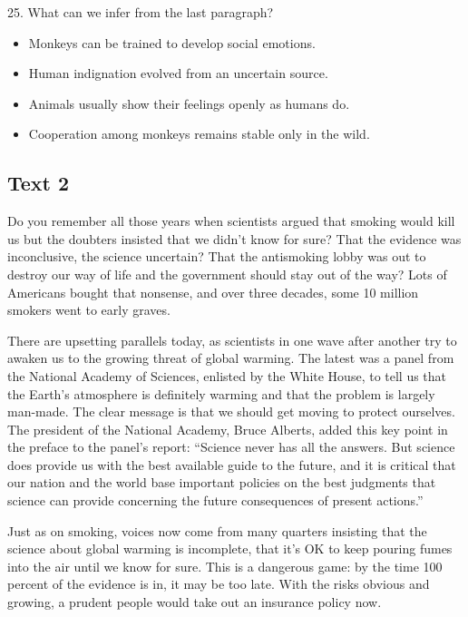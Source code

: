 \documentclass[UTF8,11pt]{ctexart}
\begin{document}
25. What can we infer from the last paragraph?


\begin{itemize}[leftmargin=2em,itemsep=.2em,topsep=.4em]\item[A.] Monkeys can be trained to develop social emotions.
\item[B.] Human indignation evolved from an uncertain source.
\item[C.] Animals usually show their feelings openly as humans do.
\item[D.] Cooperation among monkeys remains stable only in the wild.
\end{itemize}

\subsection*{\textbf{Text 2}}


Do you remember all those years when scientists argued that smoking would kill us but the doubters insisted that we didn’t know for sure? That the evidence was inconclusive, the science uncertain? That the antismoking lobby was out to destroy our way of life and the government should stay out of the way? Lots of Americans bought that nonsense, and over three decades, some 10 million smokers went to early graves.


There are upsetting parallels today, as scientists in one wave after another try to awaken us to the growing threat of global warming. The latest was a panel from the National Academy of Sciences, enlisted by the White House, to tell us that the Earth’s atmosphere is definitely warming and that the problem is largely man-made. The clear message is that we should get moving to protect ourselves. The president of the National Academy, Bruce Alberts, added this key point in the preface to the panel’s report: “Science never has all the answers. But science does provide us with the best available guide to the future, and it is critical that our nation and the world base important policies on the best judgments that science can provide concerning the future consequences of present actions.”


Just as on smoking, voices now come from many quarters insisting that the science about global warming is incomplete, that it’s OK to keep pouring fumes into the air until we know for sure. This is a dangerous game: by the time 100 percent of the evidence is in, it may be too late. With the risks obvious and growing, a prudent people would take out an insurance policy now.
\end{document}
